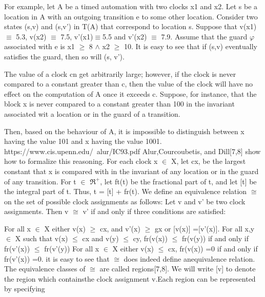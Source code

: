 \documentclass{article}
\begin{document}
	
	
	For example, let A be a timed automation with two clocks x1 and x2. Let s be a location in A with an outgoing transition e to some other location. Consider two states (s,v) and (s,v') in T(A) that correspond to location s. Suppose that v(x1) $\equiv$ 5.3, v(x2) $\equiv$ 7.5, v'(x1)$\equiv$5.5 and v'(x2) $\equiv$ 7.9. Assume that the guard $\varphi$ associated with e is x1 $\geq$ 8 $\wedge$ x2 $\geq$ 10. It is easy to see that if (s,v) eventually satisfies the guard, then so will (s, v'). \cite[p~274]{clarkmodelchecking} \\
	\newline
	
	The value of a clock cn get arbitrarily large; however, if the clock is never compared to a constant greater than c, then the value of the clock will have no effect on the computation of A once it exceeds c. Suppose, for instance, that the block x is never compared to a constant greater than 100 in the invariant associated wit a location or in the guard of a transition.
	
	Then, based on the behaviour of A, it is impossible to distinguish between x having the value 101 and x having the value 1001. https://www.cis.upenn.edu/~alur/IC93.pdf
	Alur,Courcoubetis, and Dill[7,8] show how to formalize this reasoning. For each clock x $\in$ X, let cx, be the largest constant that x is compared with in the invariant of any location or in the guard of any transition. For t $\in$  $\Re^{+}$, let ft(t) be the fractional part of t, and let [t] be the integral part of t. Thus, t = [t] + fr(t). We define an equivalence relation $\cong$ on the set of possible clock assignments as follows: Let v and v' be two clock assignments.
	Then v  $\cong$ v' if and only if three conditions are  satisfied: \\
	\newline
	
	For all x $\in$ X either v(x) $\geq$ cx, and v'(x) $\geq$ gx or [v(x)] =[v'(x)].
	For all x,y $\in$ X such that v(x) $\leq$ cx and v(y) $\leq$ cy, fr(v(x)) $\leq$ fr(v(y)) if and only if fr(v'(x)) 
	$\leq$ fr(v'(y))
	For all x $\in$ X either v(x) $\leq$ cx,
	fr(v(x)) =0 if and only if fr(v'(x)) =0.
	it is easy to see that $\cong$ does indeed define anequivalence relation. The equivalence classes of $\cong$ are called regions[7,8].  We will write [v] to denote the region which containsthe clock assignment v.Each region can be represented by specifying \\
	\newline
	
\end{document}
